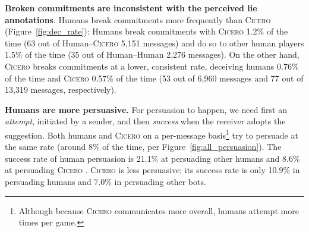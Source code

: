 \documentclass[oneside]{memoir}
\newcommand{\cicero}{\abr{Cicero} }
\newcommand{\abr}[1]{\textsc{#1}}
\begin{document}
\textbf{Broken commitments are inconsistent with the perceived lie annotations}.
%
Humans break commitments more frequently than \cicero{} (Figure~\ref{fig:dec_rate}):
%
Humans break commitments with \cicero{} 1.2\% of the time
(63 out of Human--\cicero{} 5,151 messages) and do so to other human players 1.5\% of the time (35 out of Human--Human 2,276 messages).
%
On the other hand, \cicero{} breaks commitments at a lower, consistent rate, deceiving humans 0.76\% of the time and \cicero{}  0.57\% of the time (53 out of 6,960 messages and 77 out of 13,319 messages, respectively).
%

%
%

\textbf{Humans are more persuasive.}  
For persuasion to happen, we need first an \emph{attempt}, initiated by a sender, and then \emph{success} when the receiver adopts the suggestion.
%
%
%
Both humans and \cicero{} on a per-message basis\footnote{Although because \cicero{} communicates more overall, humans attempt more times per game.} try to persuade at the same rate (around 8\% of the time, per Figure~\ref{fig:all_persuasion}).   
%
The success rate of human persuasion is 21.1\%
at persuading other humans and 8.6\% 
at persuading \cicero{}. 
%
\cicero{} is less persuasive; its success rate is only 10.9\% in persuading humans and 7.0\% in persuading other bots.
%
\end{document}
